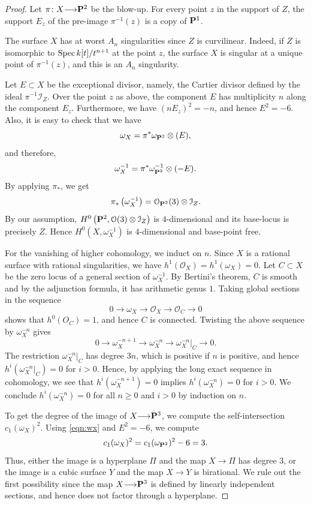 \documentclass[12pt,reqno]{amsart}
\renewcommand{\to}{{\longrightarrow}}
\numberwithin{equation}{section}
\renewcommand{\O}{\mathcal O}
\begin{document}
\begin{proof}
  Let $\pi \colon X \to \P^2$ be the blow-up.
  For every point $z$ in the support of $Z$, the support $E_z$ of the pre-image $\pi^{-1}(z)$ is a copy of $\P^1$.
  
  The surface $X$ has at worst $A_n$ singularities since $Z$ is curvilinear.
  Indeed, if $Z$ is isomorphic to $\spec k[t]/t^{n+1}$ at the point $z$, the surface $X$ is singular at a unique point of $\pi^{-1}(z)$, and this is an $A_n$ singularity.

  Let $E \subset X$ be the exceptional divisor, namely, the Cartier divisor defined by the ideal $\pi^{-1}\mathcal I_Z$.
  Over the point $z$ as above, the component $E$ has multiplicity $n$ along the component $E_z$.
  Furthermore, we have $(nE_z)^2 = -n$, and hence $E^2 = -6$.
  Also, it is easy to check that we have
  \begin{equation}\label{eqn:wx}
    \omega_X = \pi^* \omega_{\P^2} \otimes (E),
  \end{equation}
  and therefore,
  \[ \omega_X^{-1} = \pi^* \omega^{-1}_{\P^2} \otimes (-E).\]
  By applying $\pi_*$, we get
  \[ \pi_* \left( \omega_X^{-1} \right) = \O_{\P^2}(3) \otimes \mathcal I_Z.\]
  By our assumption, $H^0\left(\P^2, \O(3) \otimes \mathcal I_Z\right)$ is $4$-dimensional and its base-locus is precisely $Z$.
  Hence $H^0\left( X, \omega_X^{-1} \right)$ is $4$-dimensional and base-point free.

  For the vanishing of higher cohomology, we induct on $n$.
  Since $X$ is a rational surface with rational singularities, we have $h^1(\O_X) = h^1(\omega_X) = 0$.
  Let $C \subset X$ be the zero locus of a general section of $\omega_X^{-1}$.
  By Bertini's theorem, $C$ is smooth and by the adjunction formula, it has arithmetic genus $1$.
  Taking global sections in the sequence
  \[ 0 \to \omega_X \to \O_X \to \O_C \to 0\]
  shows that $h^0(O_C) = 1$, and hence $C$ is connected.
  Twisting the above sequence by $\omega_X^{-n}$ gives
  \[ 0 \to \omega_X^{-n+1} \to \omega_X^{-n} \to \omega_X^{-n}|_C \to 0.\]
  The restriction $\omega_X^{-n}|_C$ has degree $3n$, which is positive if $n$ is positive, and hence $h^i\left(\omega_X^{-n}|_C\right) = 0$ for $i > 0$.
  Hence, by applying the long exact sequence in cohomology, we see that $h^i(\omega_X^{-n+1}) = 0$ implies $h^i(\omega_X^{-n}) = 0$ for $i > 0$.
  We conclude $h^i(\omega_X^{-n}) = 0$ for all $n \geq 0$ and $i > 0$ by induction on $n$.
    
  To get the degree of the image of $X \to \P^3$, we compute the self-intersection $c_1(\omega_X)^2$.
  Using \eqref{eqn:wx} and $E^2 = -6$, we compute
  \[ c_1(\omega_X)^2 = c_1(\omega_{\P^2})^2 - 6 = 3.\]
  Thus, either the image is a hyperplane $\Pi$ and the map $X \to \Pi$ has degree 3, or the image is a cubic surface $Y$ and the map $X \to Y$ is birational.
  We rule out the first possibility since the map $X \to \P^3$ is defined by linearly independent sections, and hence does not factor through a hyperplane.


\end{proof}
\end{document}
